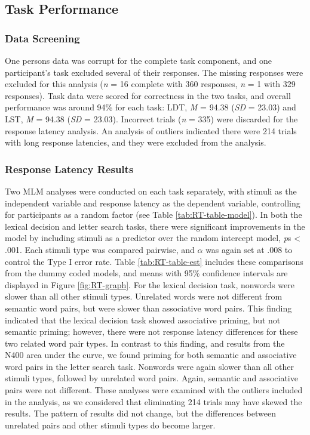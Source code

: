 \documentclass[english,man]{apa6}
\theoremstyle{definition}
\theoremstyle{definition}
\theoremstyle{definition}
\theoremstyle{remark}
\begin{document}
\subsection{Task Performance}\label{task-performance}

\subsubsection{Data Screening}\label{data-screening-1}

One persons data was corrupt for the complete task component, and one
participant's task excluded several of their responses. The missing
responses were excluded for this analysis (\emph{n} = 16 complete with
360 responses, \emph{n} = 1 with 329 responses). Task data were scored
for correctness in the two tasks, and overall performance was around
94\% for each task: LDT, \emph{M} = 94.38 (\emph{SD} = 23.03) and LST,
\emph{M} = 94.38 (\emph{SD} = 23.03). Incorrect trials (\emph{n} = 335)
were discarded for the response latency analysis. An analysis of
outliers indicated there were 214 trials with long response latencies,
and they were excluded from the analysis.

\subsubsection{Response Latency Results}\label{response-latency-results}

Two MLM analyses were conducted on each task separately, with stimuli as
the independent variable and response latency as the dependent variable,
controlling for participants as a random factor (see Table
\ref{tab:RT-table-model}). In both the lexical decision and letter
search tasks, there were significant improvements in the model by
including stimuli as a predictor over the random intercept model,
\emph{p}s \textless{} .001. Each stimuli type was compared pairwise, and
\(\alpha\) was again set at .008 to control the Type I error rate. Table
\ref{tab:RT-table-est} includes these comparisons from the dummy coded
models, and means with 95\% confidence intervals are displayed in Figure
\ref{fig:RT-graph}. For the lexical decision task, nonwords were slower
than all other stimuli types. Unrelated words were not different from
semantic word pairs, but were slower than associative word pairs. This
finding indicated that the lexical decision task showed associative
priming, but not semantic priming; however, there were not response
latency differences for these two related word pair types. In contrast
to this finding, and results from the N400 area under the curve, we
found priming for both semantic and associative word pairs in the letter
search task. Nonwords were again slower than all other stimuli types,
followed by unrelated word pairs. Again, semantic and associative pairs
were not different. These analyses were examined with the outliers
included in the analysis, as we considered that eliminating 214 trials
may have skewed the results. The pattern of results did not change, but
the differences between unrelated pairs and other stimuli types do
become larger.
\end{document}
